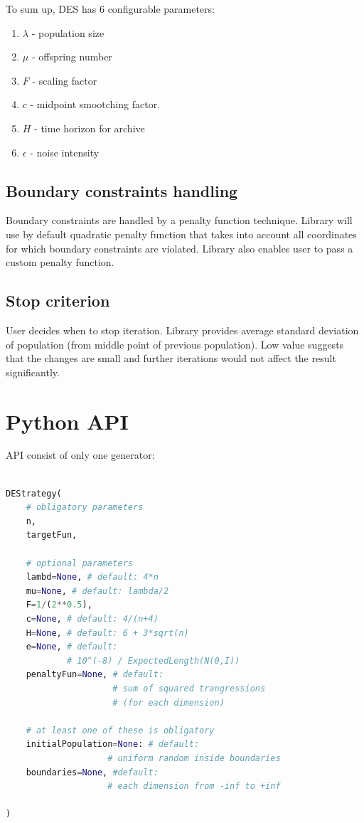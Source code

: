 \documentclass[11pt,a4paper]{article}
\begin{document}
To sum up, DES has 6 configurable parameters:
\begin{enumerate}
\item $\lambda$ - population size
\item $\mu$ - offspring number
\item $F$ - scaling factor
\item $c$ - midpoint smootching factor.
\item $H$ - time horizon for archive
\item $\epsilon$ - noise intensity
\end{enumerate}

\subsection{Boundary constraints handling}\label{subsec:constraints}

Boundary constraints are handled by a penalty function technique.
Library will use by default quadratic penalty function that takes into account all coordinates for which boundary constraints are violated.
Library also enables user to pass a custom penalty function.

\subsection{Stop criterion}\label{subsec:stop}
User decides when to stop iteration.
Library provides average standard deviation of population (from middle point of previous population).
Low value suggests that the changes are small and further iterations would not affect the result significantly.

\section{Python API}\label{sec:api}
API consist of only one generator:


\begin{lstlisting}[language=Python]

DEStrategy(
    # obligatory parameters
    n,
    targetFun,

    # optional parameters
    lambd=None, # default: 4*n
    mu=None, # default: lambda/2
    F=1/(2**0.5),
    c=None, # default: 4/(n+4)
    H=None, # default: 6 + 3*sqrt(n)
    e=None, # default:
            # 10^(-8) / ExpectedLength(N(0,I))
    penaltyFun=None, # default:
                     # sum of squared trangressions
                     # (for each dimension)

    # at least one of these is obligatory
    initialPopulation=None: # default:
                    # uniform random inside boundaries
    boundaries=None, #default:
                    # each dimension from -inf to +inf

)

\end{lstlisting}
\end{document}
